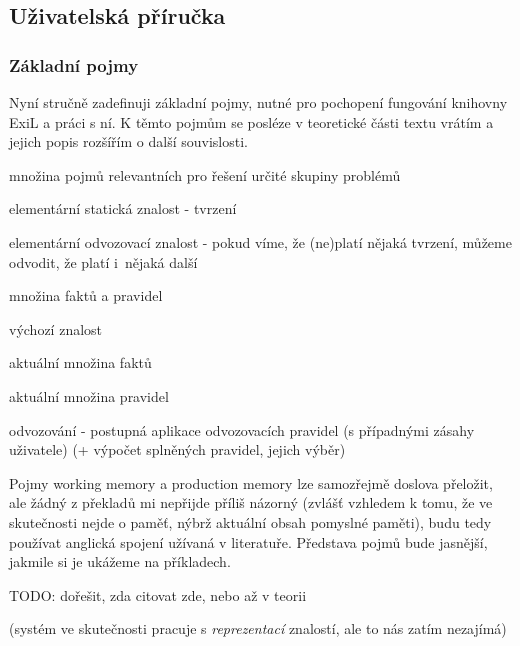 \subsection{Uživatelská příručka}
\subsubsection{Základní pojmy}
Nyní stručně zadefinuji základní pojmy, nutné pro pochopení fungování knihovny
ExiL a práci s ní. K těmto pojmům se posléze v teoretické části textu vrátím
a jejich popis rozšířím o další souvislosti.
\begin{description}[leftmargin=5cm,style=sameline]
  \item[problémová doména] množina pojmů relevantních pro řešení určité skupiny
    problémů
  \item[fakt] elementární statická znalost - tvrzení
  \item[(odvozovací) pravidlo] elementární odvozovací znalost - pokud víme, že
    (ne)platí nějaká tvrzení, můžeme odvodit, že platí i~nějaká další
  \item[znalost (v ExiLu)] množina faktů a pravidel
  \item[znalostní baze] výchozí znalost
  \item[working memory] aktuální množina faktů
  \item[production memory] aktuální množina pravidel
  \item[inference] odvozování - postupná aplikace odvozovacích pravidel
    (s případnými zásahy uživatele)
    (+ výpočet splněných pravidel, jejich výběr)
\end{description}
Pojmy working memory a production memory lze samozřejmě doslova přeložit, ale
žádný z překladů mi nepřijde příliš názorný (zvlášť vzhledem k tomu, že ve
skutečnosti nejde o paměť, nýbrž aktuální obsah pomyslné paměti), budu tedy
používat anglická spojení užívaná v literatuře. Představa pojmů bude jasnější,
jakmile si je ukážeme na příkladech.

TODO: dořešit, zda citovat zde, nebo až v teorii

(systém ve skutečnosti pracuje s \emph{reprezentací} znalostí, ale to nás zatím
nezajímá)

